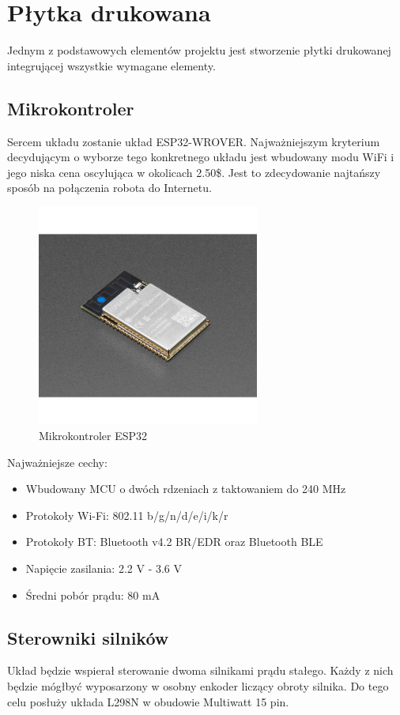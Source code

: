 \documentclass[10pt, a4paper]{article}
\begin{document}
\section{Płytka drukowana}
Jednym z podstawowych elementów projektu jest stworzenie płytki drukowanej integrującej wszystkie wymagane elementy.

\subsection{Mikrokontroler}
Sercem układu zostanie układ ESP32-WROVER. 
Najważniejszym kryterium decydującym o wyborze tego konkretnego układu jest wbudowany modu WiFi i jego niska cena oscylująca w okolicach 2.50\$.
Jest to zdecydowanie najtańszy sposób na połączenia robota do Internetu.

\begin{figure}[H]
	\centering
	\includegraphics[width=0.65\textwidth]{figures/esp.jpg}
	\caption{Mikrokontroler ESP32}
	\label{fig:esp32}
\end{figure}

Najważniejsze cechy:
\begin{itemize}
	\item Wbudowany MCU o dwóch rdzeniach z taktowaniem do 240 MHz
	\item Protokoły Wi-Fi: 802.11 b/g/n/d/e/i/k/r
	\item Protokoły BT: Bluetooth v4.2 BR/EDR oraz Bluetooth BLE
	\item Napięcie zasilania: 2.2 V - 3.6 V
	\item Średni pobór prądu: 80 mA
\end{itemize}

\subsection{Sterowniki silników}
Układ będzie wspierał sterowanie dwoma silnikami prądu stałego. 
Każdy z nich będzie mógłbyć wyposarzony w osobny enkoder liczący obroty silnika.
Do tego celu posłuży układa L298N w obudowie Multiwatt 15 pin.
\end{document}
